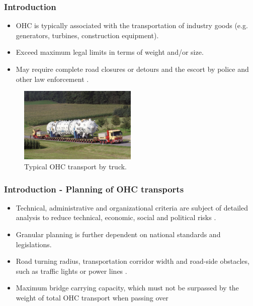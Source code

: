 \documentclass{beamer}   %
\newcommand{\RNum}[1]{\uppercase\expandafter{\romannumeral #1\relax}}
\theoremstyle{break}
\begin{document}
  \begin{frame}
    \frametitle{Introduction \RNum{2}}
    \begin{itemize}
      \item OHC is typically associated with the transportation of industry goods (e.g. generators, turbines, construction equipment).
	\item Exceed maximum legal limits in terms of weight and/or size.
	\item May require complete road closures or detours and the escort by police and other law enforcement \cite{Luo.2021}.   
    \end{itemize}

 \begin{figure}[!ht]
      \centering
      \includegraphics[width=0.5\textwidth]{../manuscript/figures/OHC.jpg}
      \caption{Typical OHC transport by truck.}
      \label{fig:higher level}
    \end{figure}

  \end{frame}

  \begin{frame}
    \frametitle{Introduction \RNum{3} - Planning of OHC transports}
    \begin{itemize}
      \item Technical, administrative and organizational criteria are subject of detailed analysis to reduce technical, economic, social and political risks \cite{Palsaitis.2012}.
	\item Granular planning is further dependent on national standards and legislations.
	\item Road turning radius, transportation corridor width and road-side obstacles, such as traffic lights or power lines \cite{PETRASKA.2018}.
	\item Maximum bridge carrying capacity, which must not be surpassed by the weight of total OHC transport when passing over
	    \end{itemize}
 \end{frame}
\end{document}
